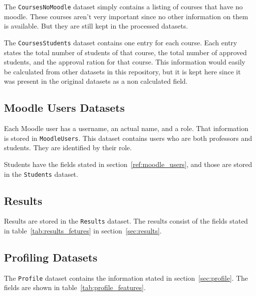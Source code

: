 The \texttt{CoursesNoMoodle} dataset simply contains a listing of courses that
have no moodle. These courses aren't very important since no other information
on them is available. But they are still kept in the processed datasets.

The \texttt{CoursesStudents} dataset contains one entry for each course. Each
entry states the total number of students of that course, the total number of
approved students, and the approval ration for that course. This information
would easily be calculated from other datasets in this repository, but it is
kept here since it was present in the original datasets as a non calculated
field.

\subsection{Moodle Users Datasets}

Each Moodle user has a username, an actual name, and a role. That information
is stored in \texttt{MoodleUsers}. This dataset contains users who are both
professors and students. They are identified by their role.

Students have the fields stated in section~\ref{ref:moodle_users}, and those
are stored in the \texttt{Students} dataset.

\subsection{Results}

Results are stored in the \texttt{Results} dataset. The results consist of the
fields stated in table~\ref{tab:results_fetures} in section~\ref{sec:results}.

\subsection{Profiling Datasets}

The \texttt{Profile} dataset contains the information stated in
section~\ref{sec:profile}. The fields are shown in
table~\ref{tab:profile_features}.

